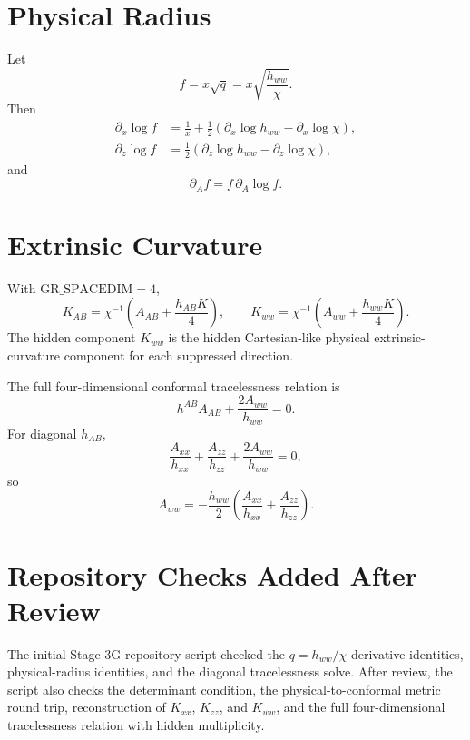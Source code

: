 \documentclass[11pt]{article}
\begin{document}
\section{Physical Radius}

Let
\begin{equation}
  f=x\sqrt{q}=x\sqrt{\frac{h_{ww}}{\chi}}.
\end{equation}
Then
\begin{align}
  \partial_x\log f
  &=
  \frac{1}{x}
  +
  \frac{1}{2}
  \left(\partial_x\log h_{ww}-\partial_x\log\chi\right),\\
  \partial_z\log f
  &=
  \frac{1}{2}
  \left(\partial_z\log h_{ww}-\partial_z\log\chi\right),
\end{align}
and
\begin{equation}
  \partial_A f=f\,\partial_A\log f.
\end{equation}

\section{Extrinsic Curvature}

With \(\mathrm{GR\_SPACEDIM}=4\),
\begin{equation}
  K_{AB}
  =
  \chi^{-1}
  \left(A_{AB}+\frac{h_{AB}K}{4}\right),
  \qquad
  K_{ww}
  =
  \chi^{-1}
  \left(A_{ww}+\frac{h_{ww}K}{4}\right).
\end{equation}
The hidden component \(K_{ww}\) is the hidden Cartesian-like physical
extrinsic-curvature component for each suppressed direction.

The full four-dimensional conformal tracelessness relation is
\begin{equation}
  h^{AB}A_{AB}+\frac{2A_{ww}}{h_{ww}}=0.
\end{equation}
For diagonal \(h_{AB}\),
\begin{equation}
  \frac{A_{xx}}{h_{xx}}
  +
  \frac{A_{zz}}{h_{zz}}
  +
  \frac{2A_{ww}}{h_{ww}}
  =
  0,
\end{equation}
so
\begin{equation}
  A_{ww}
  =
  -\frac{h_{ww}}{2}
  \left(
    \frac{A_{xx}}{h_{xx}}
    +
    \frac{A_{zz}}{h_{zz}}
  \right).
\end{equation}

\section{Repository Checks Added After Review}

The initial Stage 3G repository script checked the \(q=h_{ww}/\chi\)
derivative identities, physical-radius identities, and the diagonal
tracelessness solve. After review, the script also checks the determinant
condition, the physical-to-conformal metric round trip, reconstruction of
\(K_{xx}\), \(K_{zz}\), and \(K_{ww}\), and the full four-dimensional
tracelessness relation with hidden multiplicity.
\end{document}

